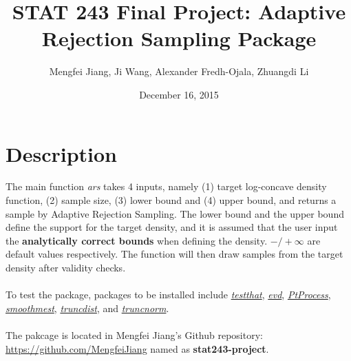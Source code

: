 \documentclass{article}\usepackage[]{graphicx}\usepackage[]{color}
\begin{document}
 

\title{STAT 243 Final Project: Adaptive Rejection Sampling Package}
\author{Mengfei Jiang, Ji Wang, Alexander Fredh-Ojala, Zhuangdi Li}
\date{December 16, 2015}

\maketitle

\tableofcontents

\newpage

\section{Description}
The main function \textit{ars} takes 4 inputs, namely (1) target log-concave density 
function, (2) sample size, (3) lower bound and (4) upper bound, and returns a sample 
by Adaptive Rejection Sampling. The lower bound and the upper bound define the support 
for the target density, and it is assumed that the user input the \textbf{analytically correct 
bounds} when defining the density. $-/+ \infty$ are default values respectively.
The function will then draw samples from the target density after validity checks.\\
\\
To test the package, packages to be installed include 
\href{https://cran.r-project.org/web/packages/testthat/index.html}{\textit{testthat}},
\href{https://cran.r-project.org/web/packages/evd/index.html}{\textit{evd}}, 
\href{https://cran.r-project.org/web/packages/PtProcess/index.html}{\textit{PtProcess}}, 
\href{https://cran.r-project.org/web/packages/smoothmest/index.html}{\textit{smoothmest}}, 
\href{https://cran.r-project.org/web/packages/truncdist/index.html}{\textit{truncdist}}, and
\href{https://cran.r-project.org/web/packages/truncnorm/index.html}{\textit{truncnorm}}.\\
\\
The pakcage is located in Mengfei Jiang's Github repository: \url{https://github.com/MengfeiJiang}
named as \textbf{stat243-project}.
\end{document}
